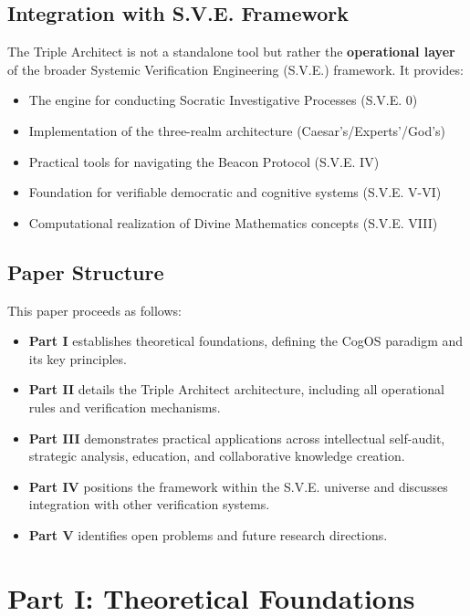 \documentclass[11pt,a4paper]{article}
\theoremstyle{definition}
\theoremstyle{remark}
\begin{document}
\subsection{Integration with S.V.E. Framework}

The Triple Architect is not a standalone tool but rather the \textbf{operational layer} of the broader Systemic Verification Engineering (S.V.E.) framework. It provides:

\begin{itemize}
    \item The engine for conducting Socratic Investigative Processes (S.V.E. 0)
    \item Implementation of the three-realm architecture (Caesar's/Experts'/God's)
    \item Practical tools for navigating the Beacon Protocol (S.V.E. IV)
    \item Foundation for verifiable democratic and cognitive systems (S.V.E. V-VI)
    \item Computational realization of Divine Mathematics concepts (S.V.E. VIII)
\end{itemize}

\subsection{Paper Structure}

This paper proceeds as follows:

\begin{itemize}
    \item \textbf{Part I} establishes theoretical foundations, defining the CogOS paradigm and its key principles.
    \item \textbf{Part II} details the Triple Architect architecture, including all operational rules and verification mechanisms.
    \item \textbf{Part III} demonstrates practical applications across intellectual self-audit, strategic analysis, education, and collaborative knowledge creation.
    \item \textbf{Part IV} positions the framework within the S.V.E. universe and discusses integration with other verification systems.
    \item \textbf{Part V} identifies open problems and future research directions.
\end{itemize}

\section{Part I: Theoretical Foundations}
\end{document}
